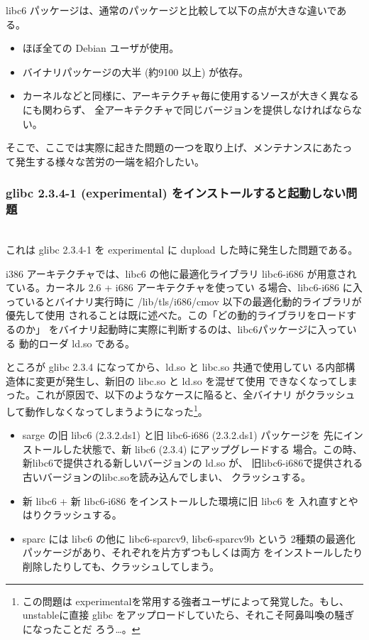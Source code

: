 \documentclass[mingoth]{jsarticle}
\newcommand{\subsubsubsection}[1]{%
\vspace{1zw}{\bf #1}\\}
\begin{document}
  libc6 パッケージは、通常のパッケージと比較して以下の点が大きな違いである。

	\begin{itemize}
	  \item ほぼ全ての Debian ユーザが使用。
	  \item バイナリパッケージの大半 (約9100 以上)
	        が依存。
	  \item カーネルなどと同様に、アーキテクチャ毎に使用するソースが大きく異なるにも関わらず、
	        全アーキテクチャで同じバージョンを提供しなければならない。
	\end{itemize}

  そこで、ここでは実際に起きた問題の一つを取り上げ、メンテナンスにあたっ
  て発生する様々な苦労の一端を紹介したい。

  \subsubsection{glibc 2.3.4-1 (experimental) をインストールすると起動しない問題}
   \subsubsubsection{発生した問題}

    これは glibc 2.3.4-1 を experimental に dupload した時に発生した問題である。

    i386 アーキテクチャでは、libc6 の他に最適化ライブラリ libc6-i686 
    が用意されている。カーネル 2.6 + i686 アーキテクチャを使ってい
    る場合、libc6-i686 に入っているとバイナリ実行時に
    /lib/tls/i686/cmov 以下の最適化動的ライブラリが優先して使用
    されることは既に述べた。この「どの動的ライブラリをロードするのか」
    をバイナリ起動時に実際に判断するのは、libc6パッケージに入っている
    動的ローダ ld.so である。

    ところが glibc 2.3.4 になってから、ld.so と libc.so 共通で使用してい
    る内部構造体に変更が発生し、新旧の libc.so と ld.so を混ぜて使用
    できなくなってしまった。これが原因で、以下のようなケースに陥ると、全バイナリ
    がクラッシュして動作しなくなってしまうようになった\footnote{この問題は
    experimentalを常用する強者ユーザによって発覚した。もし、unstableに直接
    glibc をアップロードしていたら、それこそ阿鼻叫喚の騒ぎになったことだ
    ろう…。}。

    \begin{itemize}
     \item sarge の旧 libc6 (2.3.2.ds1) と旧 libc6-i686 (2.3.2.ds1) パッケージを
       先にインストールした状態で、新 libc6 (2.3.4) にアップグレードする
	   場合。この時、新libc6で提供される新しいバージョンの ld.so が、
	   旧libc6-i686で提供される古いバージョンのlibc.soを読み込んでしまい、
	   クラッシュする。
     \item 新 libc6 + 新 libc6-i686 をインストールした環境に旧 libc6 を
	   入れ直すとやはりクラッシュする。
     \item sparc には libc6 の他に libc6-sparcv9, libc6-sparcv9b という
	   2種類の最適化パッケージがあり、それぞれを片方ずつもしくは両方
	   をインストールしたり削除したりしても、クラッシュしてしまう。
    \end{itemize}
\end{document}
